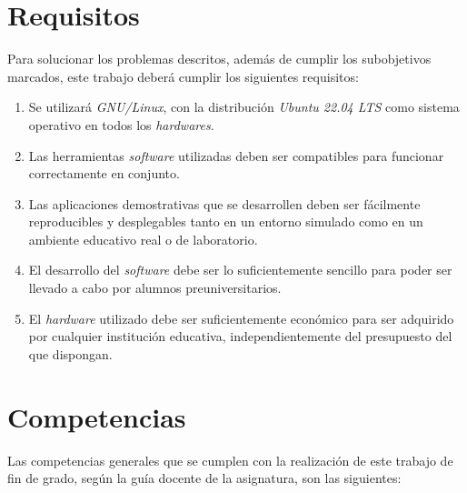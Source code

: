 
\section{Requisitos}
\label{sec:requisitos}

Para solucionar los problemas descritos, además de cumplir los subobjetivos
marcados, este trabajo deberá cumplir los siguientes requisitos:

\begin{enumerate}
    \item{Se utilizará \textit{GNU/Linux}, con la distribución
        \textit{Ubuntu 22.04 LTS} como sistema operativo en todos los
        \textit{hardwares}.}
    \item{Las herramientas \textit{software} utilizadas deben ser compatibles
        para funcionar correctamente en conjunto.}
    \item{Las aplicaciones demostrativas que se desarrollen deben ser fácilmente
        reproducibles y desplegables tanto en un entorno simulado como en un
        ambiente educativo real o de laboratorio.}
    \item{El desarrollo del \textit{software} debe ser lo suficientemente
        sencillo para poder ser llevado a cabo por alumnos preuniversitarios.}
    \item{El \textit{hardware} utilizado debe ser suficientemente económico para
        ser adquirido por cualquier institución educativa, independientemente
        del presupuesto del que dispongan.}
\end{enumerate}



\section{Competencias}
\label{sec:requisitos}

Las competencias generales que se cumplen con la realización de este trabajo de
fin de grado, según la guía docente de la asignatura, son las siguientes:

